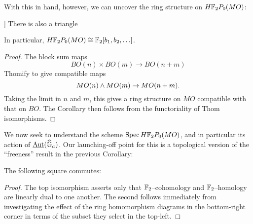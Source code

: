 With this in hand, however, we can uncover the ring structure on $H\mathbb F_2P_0(MO)$:
\begin{corollary}\label{HF2MOisFree}]
There is also a triangle
\begin{center}
\end{center}
In particular, $H\mathbb F_2P_0(MO) \cong \mathbb F_2[b_1, b_2, \ldots]$.
\end{corollary}
\begin{proof}
The block sum maps \[BO(n) \times BO(m) \to BO(n+m)\] Thomify to give compatible maps \[MO(n) \wedge MO(m) \to MO(n+m).\]  Taking the limit in $n$ and $m$, this gives a ring structure on $MO$ compatible with that on $BO$.  The Corollary then follows from the functoriality of Thom isomorphisms.
\end{proof}

We now seek to understand the scheme $\operatorname{Spec} H\mathbb F_2P_0(MO)$, and in particular its action of $\operatorname{\underline{\smash{\operatorname{Aut}}}}(\widehat{\mathbb G}_a)$.  Our launching-off point for this is a topological version of the ``freeness'' result in the previous Corollary:
\begin{lemma}\label{DetectingMORingMapsInHomotopy}
The following square commutes:
\begin{center}
\end{center}
\end{lemma}
\begin{proof}
The top isomorphism asserts only that $\mathbb F_2$--cohomology and $\mathbb F_2$--homology are linearly dual to one another.  The second follows immediately from investigating the effect of the ring homomorphism diagrams in the bottom-right corner in terms of the subset they select in the top-left.
\end{proof}

